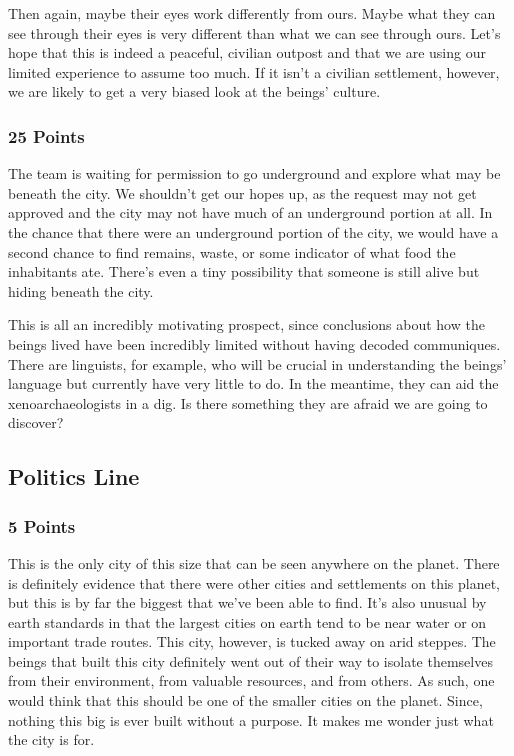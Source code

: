 \documentclass[conference]{IEEEtran}
\begin{document}
Then again, maybe their eyes work differently from ours. Maybe what they can see through their eyes is very different than what we can see through ours.  Let’s hope that this is indeed a peaceful, civilian outpost and that we are using our limited experience to assume too much. If it isn’t a civilian settlement, however, we are likely to get a very biased look at the beings’ culture. 

\subsubsection*{25 Points}
The team is waiting for permission to go underground and explore what may be beneath the city. We shouldn’t get our hopes up, as the request may not get approved and the city may not have much of an underground portion at all. In the chance that there were an underground portion of the city, we would have a second chance to find remains, waste, or some indicator of what food the inhabitants ate. There’s even a tiny possibility that someone is still alive but hiding beneath the city.

This is all an incredibly motivating prospect, since conclusions about how the beings lived have been incredibly limited without having decoded communiques. There are linguists, for example, who will be crucial in understanding the beings’ language but currently have very little to do. In the meantime, they can aid the xenoarchaeologists in a dig. Is there something they are afraid we are going to discover?

\subsection{Politics Line}

\subsubsection*{5 Points}
This is the only city of this size that can be seen anywhere on the planet. There is definitely evidence that there were other cities and settlements on this planet, but this is by far the biggest that we’ve been able to find. It’s also unusual by earth standards in that the largest cities on earth tend to be near water or on important trade routes. This city, however, is tucked away on arid steppes. The beings that built this city definitely went out of their way to isolate themselves from their environment, from valuable resources, and from others. As such, one would think that this should be one of the smaller cities on the planet. Since, nothing this big is ever built without a purpose. It makes me wonder just what the city is for.
\end{document}
